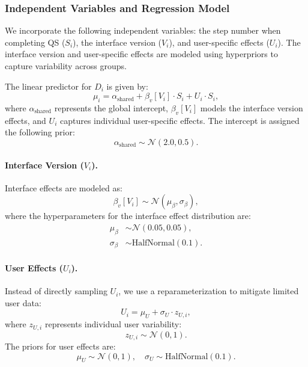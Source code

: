 \subsubsection{Independent Variables and Regression Model}
We incorporate the following independent variables: the step number when completing QS ($S_i$), the interface version ($V_i$), and user-specific effects ($U_i$). The interface version and user-specific effects are modeled using hyperpriors to capture variability across groups.

The linear predictor for $D_i$ is given by:
\begin{equation}\label{eq:model3_mu}
    \mu_i = \alpha_{\text{shared}} + \beta_v[V_i] \cdot S_i + U_i \cdot S_i,
\end{equation}
where $\alpha_{\text{shared}}$ represents the global intercept, $\beta_v[V_i]$ models the interface version effects, and $U_i$ captures individual user-specific effects. The intercept is assigned the following prior:
\begin{equation}\label{eq:model3_prior_shared}
    \alpha_{\text{shared}} \sim \mathcal{N}(2.0, 0.5).
\end{equation}

\paragraph{Interface Version ($V_i$).} Interface effects are modeled as:
\begin{equation}\label{eq:model3_prior_beta}
    \beta_v[V_i] \sim \mathcal{N}(\mu_{\beta}, \sigma_{\beta}),
\end{equation}
where the hyperparameters for the interface effect distribution are:
\begin{align}
    \mu_{\beta} &\sim \mathcal{N}(0.05, 0.05), \label{eq:model3_prior_beta_mu}\\
    \sigma_{\beta} &\sim \text{HalfNormal}(0.1). \label{eq:model3_prior_beta_sigma}
\end{align}

\paragraph{User Effects ($U_i$).} Instead of directly sampling $U_i$, we use a reparameterization to mitigate limited user data:
\begin{equation}\label{eq:model3_user_mu}
    U_i = \mu_U + \sigma_U \cdot z_{U,i},
\end{equation}
where $z_{U,i}$ represents individual user variability:
\begin{equation}\label{eq:model3_prior_z}
    z_{U,i} \sim \mathcal{N}(0,1).
\end{equation}
The priors for user effects are:
\begin{equation}\label{eq:model3_prior_user}
    \mu_U \sim \mathcal{N}(0,1), \quad \sigma_U \sim \text{HalfNormal}(0.1).
\end{equation}

